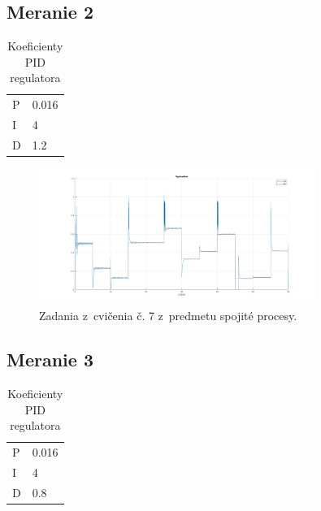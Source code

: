 \documentclass{article}
\begin{document}
\subsection{Meranie 2}
\label{sec:meranie2}

\begin{table}[!htbp]
	\caption{Koeficienty PID regulatora}
	\label{tab:t2}
	\begin{center}
		\begin{tabular}[c]{|l|l|}
			\hline

			P & 0.016 \\
			I & 4 \\
			D & 1.2 \\
			\hline
		\end{tabular}
	\end{center}
\end{table}

\begin{figure}[!htbp]
	\begin{center}
		\includegraphics[width=0.8\textwidth]{./include/m2.png}
	\end{center}
	\caption{Zadania z~cvičenia č. 7 z~predmetu spojité procesy.}
	\label{fig:meranie2}
\end{figure}

\subsection{Meranie 3}
\label{sec:meranie3}

\begin{table}[!htbp]
	\caption{Koeficienty PID regulatora}
	\label{tab:t3}
	\begin{center}
		\begin{tabular}[c]{|l|l|}
			\hline

			P & 0.016 \\
			I & 4 \\
			D & 0.8 \\
			\hline
		\end{tabular}
	\end{center}
\end{table}
\end{document}
